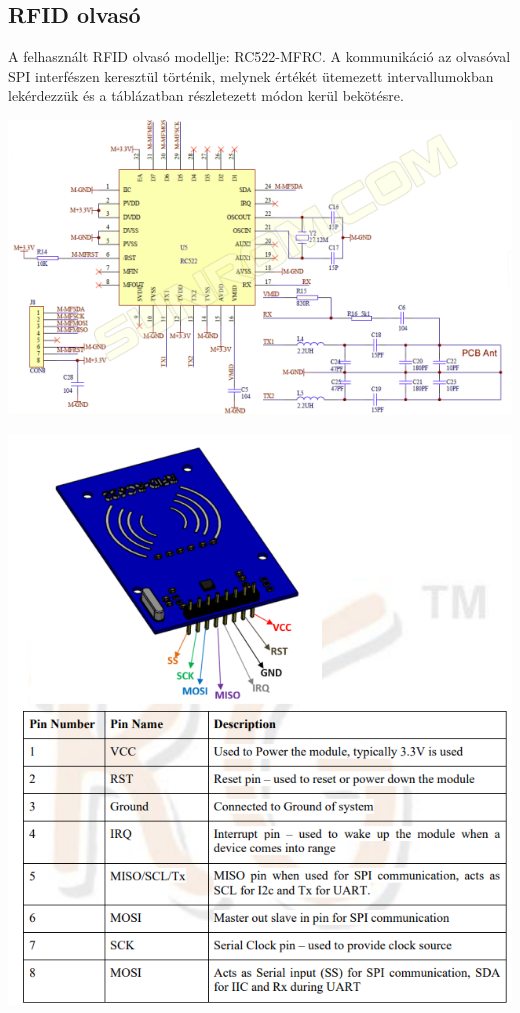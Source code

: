 \documentclass[11pt, a4paper]{article}
\begin{document}
		\subsection{RFID olvasó}
		\begin{flushleft}
			\justifying
			A felhasznált RFID olvasó modellje: RC522-MFRC. A kommunikáció az olvasóval SPI interfészen keresztül történik, melynek értékét ütemezett intervallumokban lekérdezzük és a táblázatban részletezett módon kerül bekötésre.
		\end{flushleft}
			\begin{minipage}{\linewidth}
				\centering
				\includegraphics[width=0.7\linewidth]{img/rc552_shematic}
				\label{fig:3rfidschematic}
			\end{minipage}
			\begin{minipage}{\linewidth}
				\centering
				\includegraphics[width=0.7\linewidth]{img/rc552_pinout}
				\label{fig:4rfidpinout}
			\end{minipage}
			
\end{document}

